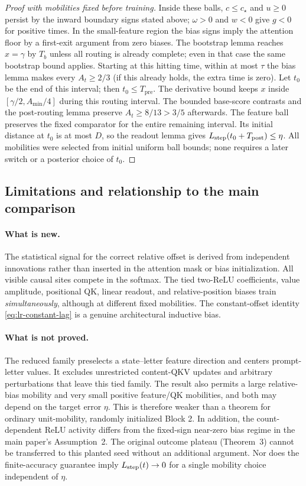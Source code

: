 \begin{proof}[Proof with mobilities fixed before training]
Inside these balls, $c\le c_\star$ and $u\ge0$ persist by the inward
boundary signs stated above; $\omega>0$ and $w<0$ give $g<0$ for positive
times. In the small-feature region the bias signs imply the attention
floor by a first-exit argument from zero biases. The bootstrap lemma
reaches $x=\gamma$ by $T_b$ unless all routing is already complete;
even in that case the same bootstrap bound applies. Starting at this
hitting time, within at most $\tau$ the bias lemma makes every
$A_t\ge2/3$ (if this already holds, the extra time is zero). Let $t_0$
be the end of this interval; then $t_0\le T_{\mathrm{pre}}$.
The derivative bound keeps $x$ inside $[\gamma/2,A_{\min}/4]$ during
this routing interval. The bounded base-score contrasts and the
post-routing lemma preserve $A_t\ge8/13>3/5$ afterwards.
The feature ball preserves the fixed comparator for the entire remaining
interval. Its initial distance at $t_0$ is at most $D$, so the readout
lemma gives $L_{\mathrm{step}}(t_0+T_{\mathrm{post}})\le\eta$.
All mobilities were selected from initial uniform ball bounds; none
requires a later switch or a posterior choice of $t_0$.
\end{proof}

\subsection{Limitations and relationship to the main comparison}
\label{app:weak-routing-limitations}

\paragraph{What is new.}
The statistical signal for the correct relative offset is derived from
independent innovations rather than inserted in the attention mask or bias
initialization.  All visible causal sites compete in the softmax.  The
tied two-ReLU coefficients, value amplitude, positional QK, linear readout,
and relative-position biases train \emph{simultaneously}, although at
different fixed mobilities.  The constant-offset identity
\eqref{eq:lr-constant-lag} is a genuine architectural inductive bias.

\paragraph{What is not proved.}
The reduced family preselects a state--letter feature direction and
centers prompt-letter values.  It excludes unrestricted content-QKV
updates and arbitrary perturbations that leave this tied family.
The result also permits a large relative-bias mobility and very small
positive feature/QK mobilities, and both may depend on the target error
$\eta$.  This is therefore weaker than a theorem for ordinary
unit-mobility, randomly initialized Block 2.  In addition, the
count-dependent ReLU activity differs from the fixed-sign near-zero
bias regime in the main paper's Assumption~2.  The original outcome
plateau (Theorem~3) cannot be transferred to this planted seed without
an additional argument.  Nor does the finite-accuracy guarantee imply
$L_{\mathrm{step}}(t)\to0$ for a single mobility choice independent of $\eta$.

